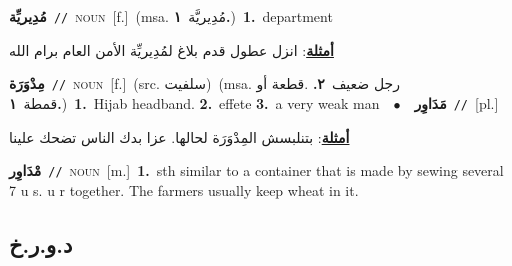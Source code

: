\documentclass[10pt,a4paper,twoside]{article} %
\begin{document}
\begin{multicols}{2}
{\setlength\topsep{0pt}\textbf{\foreignlanguage{arabic}{مُدِيريِّة}}\ {\color{gray}\texttt{//}\color{black}}\ \textsc{noun}\ [f.]\ \color{gray}(msa. \foreignlanguage{arabic}{مُدِيريَّة}~\foreignlanguage{arabic}{\textbf{١.}})\color{black}\ \textbf{1.}~department\  \begin{flushright}\color{gray}\foreignlanguage{arabic}{\textbf{\underline{\foreignlanguage{arabic}{أمثلة}}}: انزل عطول قدم بلاغ لمُدِيريِّة الأمن العام برام الله}\end{flushright}\color{black}} \vspace{2mm}

{\setlength\topsep{0pt}\textbf{\foreignlanguage{arabic}{مِدْوَرَة}}\ {\color{gray}\texttt{//}\color{black}}\ \textsc{noun}\ [f.]\ (src. \color{gray}\foreignlanguage{arabic}{سلفيت}\color{black})\ \color{gray}(msa. \foreignlanguage{arabic}{رجل ضعيف}~\foreignlanguage{arabic}{\textbf{٢.}}  .\foreignlanguage{arabic}{قطعة أو قمطة}~\foreignlanguage{arabic}{\textbf{١.}})\color{black}\ \textbf{1.}~Hijab headband.  \textbf{2.}~effete  \textbf{3.}~a very weak man\ \ $\bullet$\ \ \setlength\topsep{0pt}\textbf{\foreignlanguage{arabic}{مَدَاوِر}}\ {\color{gray}\texttt{//}\color{black}}\ [pl.]\  \begin{flushright}\color{gray}\foreignlanguage{arabic}{\textbf{\underline{\foreignlanguage{arabic}{أمثلة}}}: بتنلبسش المِدْوَرَة لحالها. عزا بدك الناس تضحك علينا}\end{flushright}\color{black}} \vspace{2mm}

{\setlength\topsep{0pt}\textbf{\foreignlanguage{arabic}{مْدَاوِر}}\ {\color{gray}\texttt{//}\color{black}}\ \textsc{noun}\ [m.]\ \textbf{1.}~sth similar to a container that is made by sewing several 7 u s. u r together. The farmers usually keep wheat in it.\ } \vspace{2mm}

\vspace{-3mm}
\subsection*{\color{blue}\foreignlanguage{arabic}{د.و.ر.خ}\color{blue}{}} 


\end{multicols}
\end{document}
